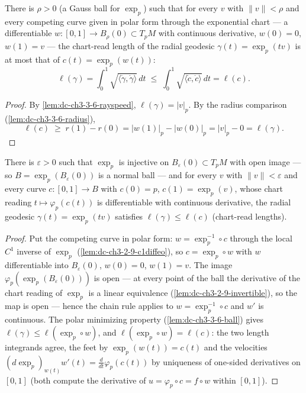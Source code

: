 \begin{lemma}
  \label{lem:dc-ch3-3-6-ball}


  There is $\rho>0$ (a Gauss ball for $\exp_p$) such that for every $v$ with
  $\|v\|<\rho$ and every competing curve given in polar form through the
  exponential chart — a differentiable $w:[0,1]\to B_\rho(0)\subset T_pM$ with
  continuous derivative, $w(0)=0$, $w(1)=v$ — the chart-read length of the
  radial geodesic $\gamma(t)=\exp_p(tv)$ is at most that of
  $c(t)=\exp_p(w(t))$:
  $$\ell(\gamma)=\int_0^1\sqrt{\langle\dot\gamma,\dot\gamma\rangle}\,dt
    \;\le\;\int_0^1\sqrt{\langle\dot c,\dot c\rangle}\,dt=\ell(c).$$
\end{lemma}
\begin{proof}
  \sketch

  By \cref{lem:dc-ch3-3-6-rayspeed}, $\ell(\gamma)=|v|_p$. By the radius
  comparison (\cref{lem:dc-ch3-3-6-radius}),
  $$\ell(c)\;\ge\;r(1)-r(0)=|w(1)|_p-|w(0)|_p=|v|_p-0=\ell(\gamma).
  $$
\end{proof}

\begin{lemma}
  \label{lem:dc-ch3-3-6-normal}


  There is $\varepsilon>0$ such that $\exp_p$ is injective on
  $B_\varepsilon(0)\subset T_pM$ with open image — so
  $B=\exp_p(B_\varepsilon(0))$ is a normal ball — and for every $v$ with
  $\|v\|<\varepsilon$ and every curve $c:[0,1]\to B$ with $c(0)=p$,
  $c(1)=\exp_p(v)$, whose chart reading $t\mapsto\varphi_p(c(t))$ is
  differentiable with continuous derivative, the radial geodesic
  $\gamma(t)=\exp_p(tv)$ satisfies $\ell(\gamma)\le\ell(c)$ (chart-read
  lengths).
\end{lemma}
\begin{proof}
  \sketch

  Put the competing curve in polar form: $w=\exp_p^{-1}\circ c$ through the
  local $C^1$ inverse of $\exp_p$ (\cref{lem:dc-ch3-2-9-c1diffeo}), so
  $c=\exp_p\circ w$ with $w$ differentiable into $B_\varepsilon(0)$,
  $w(0)=0$, $w(1)=v$. The image $\varphi_p(\exp_p(B_\varepsilon(0)))$ is open
  — at every point of the ball the derivative of the chart reading of
  $\exp_p$ is a linear equivalence (\cref{lem:dc-ch3-2-9-invertible}), so the
  map is open — hence the chain rule applies to $w=\exp_p^{-1}\circ c$ and
  $w'$ is continuous. The polar minimizing property
  (\cref{lem:dc-ch3-3-6-ball}) gives $\ell(\gamma)\le\ell(\exp_p\circ w)$,
  and $\ell(\exp_p\circ w)=\ell(c)$: the two length integrands agree, the
  feet by $\exp_p(w(t))=c(t)$ and the velocities
  $(d\exp_p)_{w(t)}w'(t)=\frac{d}{dt}\varphi_p(c(t))$ by uniqueness of
  one-sided derivatives on $[0,1]$ (both compute the derivative of
  $u=\varphi_p\circ c=f\circ w$ within $[0,1]$).
\end{proof}

